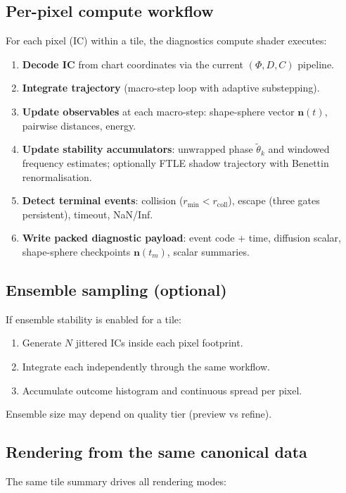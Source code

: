 \documentclass[11pt]{report}
\begin{document}
\subsection{Per-pixel compute workflow}

For each pixel (IC) within a tile, the diagnostics compute shader executes:

\begin{enumerate}[nosep]
\item \textbf{Decode IC} from chart coordinates via the current $(\Phi, D, C)$ pipeline.
\item \textbf{Integrate trajectory} (macro-step loop with adaptive substepping).
\item \textbf{Update observables} at each macro-step: shape-sphere vector $\mathbf n(t)$, pairwise distances, energy.
\item \textbf{Update stability accumulators}: unwrapped phase $\tilde\theta_k$ and windowed frequency estimates; optionally FTLE shadow trajectory with Benettin renormalisation.
\item \textbf{Detect terminal events}: collision ($r_{\min}<r_{\text{coll}}$), escape (three gates persistent), timeout, NaN/Inf.
\item \textbf{Write packed diagnostic payload}: event code + time, diffusion scalar, shape-sphere checkpoints $\mathbf n(t_m)$, scalar summaries.
\end{enumerate}

\subsection{Ensemble sampling (optional)}

If ensemble stability is enabled for a tile:
\begin{enumerate}[nosep]
\item Generate $N$ jittered ICs inside each pixel footprint.
\item Integrate each independently through the same workflow.
\item Accumulate outcome histogram and continuous spread per pixel.
\end{enumerate}
Ensemble size may depend on quality tier (preview vs refine).

\subsection{Rendering from the same canonical data}

The same tile summary drives all rendering modes:
\end{document}
